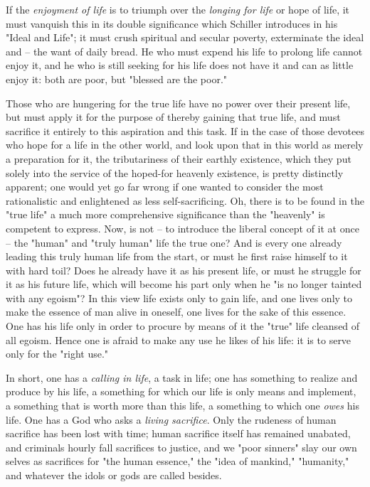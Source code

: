 \documentclass[a4paper]{book}
\begin{document}
If the \textit{enjoyment of life} is to triumph over the \textit{longing for 
life} or hope of life, it must vanquish this in its double significance which 
Schiller introduces in his "{}Ideal and Life"{}; it must crush spiritual and 
secular poverty, exterminate the ideal and -- the want of daily bread. He who 
must expend his life to prolong life cannot enjoy it, and he who is still 
seeking for his life does not have it and can as little enjoy it: both are 
poor, but "{}blessed are the poor."{}

Those who are hungering for the true life have no power over their present 
life, but must apply it for the purpose of thereby gaining that true life, and 
must sacrifice it entirely to this aspiration and this task. If in the case of 
those devotees who hope for a life in the other world, and look upon that in 
this world as merely a preparation for it, the tributariness of their earthly 
existence, which they put solely into the service of the hoped-for heavenly 
existence, is pretty distinctly apparent; one would yet go far wrong if one 
wanted to consider the most rationalistic and enlightened as less 
self-sacrificing. Oh, there is to be found in the "{}true life"{} a much more 
comprehensive significance than the "{}heavenly"{} is competent to express. 
Now, is not -- to introduce the liberal concept of it at once -- the 
"{}human"{} and "{}truly human"{} life the true one? And is every one already 
leading this truly human life from the start, or must he first raise himself 
to it with hard toil? Does he already have it as his present life, or must he 
struggle for it as his future life, which will become his part only when he 
"{}is no longer tainted with any egoism"{}? In this view life exists only to 
gain life, and one lives only to make the essence of man alive in oneself, one 
lives for the sake of this essence. One has his life only in order to procure 
by means of it the "{}true"{} life cleansed of all egoism. Hence one is afraid 
to make any use he likes of his life: it is to serve only for the "{}right 
use."{}

In short, one has a \textit{calling in life}, a task in life; one has 
something to realize and produce by his life, a something for which our life 
is only means and implement, a something that is worth more than this life, a 
something to which one \textit{owes} his life. One has a God who asks a 
\textit{living sacrifice}. Only the rudeness of human sacrifice has been lost 
with time; human sacrifice itself has remained unabated, and criminals hourly 
fall sacrifices to justice, and we "{}poor sinners"{} slay our own selves as 
sacrifices for "{}the human essence,"{} the "{}idea of mankind,"{} 
"{}humanity,"{} and whatever the idols or gods are called besides.
\end{document}
